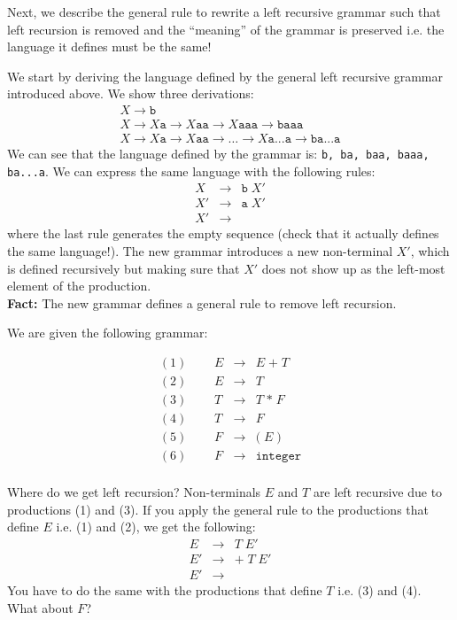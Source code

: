 \documentclass[11pt]{article}
\newcommand{\rul}{\rightarrow}
\newcommand{\syntax}[1]{\texttt{#1}}
\begin{document}
Next, we describe the general rule to rewrite a left recursive grammar such that left recursion is removed and the  ``meaning'' of the grammar is preserved i.e. the language it defines must be the same!

We start by deriving the language defined by the general left recursive grammar introduced above. We show three derivations:
$$
\begin{array}{l}
X \rul \syntax{b} \\
X \rul X \syntax{a} \rul X\syntax{aa} \rul X\syntax{aaa} \rul \syntax{baaa}\\
X \rul X \syntax{a} \rul X\syntax{aa} \rul \ldots \rul X\syntax{a...a} \rul \syntax{ba...a}
\end{array}
$$
We can see that the language defined by the grammar is: \syntax{b, ba, baa, baaa, ba...a}. We can express the same language with the following rules:
$$
\begin{array}{rcl}
X & \rul & \syntax{b} \; X' \\
X' & \rul & \syntax{a}\; X'\\
X' & \rul & 
\end{array}
$$
where the last rule generates the empty sequence (check that it actually defines the same language!). The new grammar introduces a new non-terminal $X'$, which is defined recursively but making sure that $X'$ does not show up as the left-most element of the production. \\
\textbf{Fact:} The new grammar defines a general rule to remove left recursion. 

We are given the following grammar:

$$
\begin{array}{llcl}
(1)\;\;\;\;\; & E & \rul & E \;\syntax{+}\; T \\
(2) & E & \rul & T \\
(3) & T & \rul & T \;\syntax{*}\; F \\
(4) & T & \rul & F \\
(5) & F & \rul & \syntax{(} \;E\; \syntax{)} \\
(6) & F & \rul & \syntax{integer} \\
\end{array}
$$

Where do we get left recursion? Non-terminals $E$ and $T$ are left recursive due to productions (1) and (3). If you apply the general rule to  the productions that define $E$ i.e. (1) and (2), we get the following:
$$
\begin{array}{rcl}
E & \rul & T \; E' \\
E' & \rul & \syntax{+}\; T \; E' \\
E' & \rul & 
\end{array}
$$
You have to do the same with the productions that define $T$ i.e. (3) and (4). What about $F$?
\end{document}
